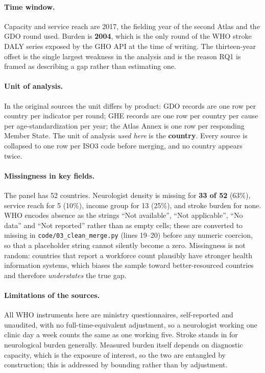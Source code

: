 \documentclass[10pt]{article}
\begin{document}
\paragraph{Time window.} Capacity and service reach are 2017, the fielding year
of the second Atlas and the GDO round used. Burden is \textbf{2004}, which is
the only round of the WHO stroke DALY series exposed by the GHO API at the time
of writing. The thirteen-year offset is the single largest weakness in the
analysis and is the reason RQ1 is framed as describing a gap rather than
estimating one.

\paragraph{Unit of analysis.} In the original sources the unit differs by
product: GDO records are one row per country per indicator per round; GHE records
are one row per country per cause per age-standardization per year; the Atlas
Annex is one row per responding Member State. The unit of analysis
\emph{used here} is the \textbf{country}. Every source is collapsed to one row
per ISO3 code before merging, and no country appears twice.

\paragraph{Missingness in key fields.} The panel has 52 countries.
Neurologist density is missing for \textbf{33 of 52} (63\%), service reach for
5 (10\%), income group for 13 (25\%), and stroke burden for none. WHO encodes
absence as the strings ``Not available'', ``Not applicable'', ``No data'' and
``Not reported'' rather than as empty cells; these are converted to missing in
\texttt{code/03\_clean\_merge.py} (lines 19--20) before any numeric coercion, so
that a placeholder string cannot silently become a zero. Missingness is not
random: countries that report a workforce count plausibly have stronger health
information systems, which biases the sample toward better-resourced countries
and therefore \emph{understates} the true gap.

\paragraph{Limitations of the sources.} All WHO instruments here are ministry
questionnaires, self-reported and unaudited, with no full-time-equivalent
adjustment, so a neurologist working one clinic day a week counts the same as
one working five. Stroke stands in for neurological burden generally. Measured
burden itself depends on diagnostic capacity, which is the exposure of interest,
so the two are entangled by construction; this is addressed by bounding rather
than by adjustment.
\end{document}
